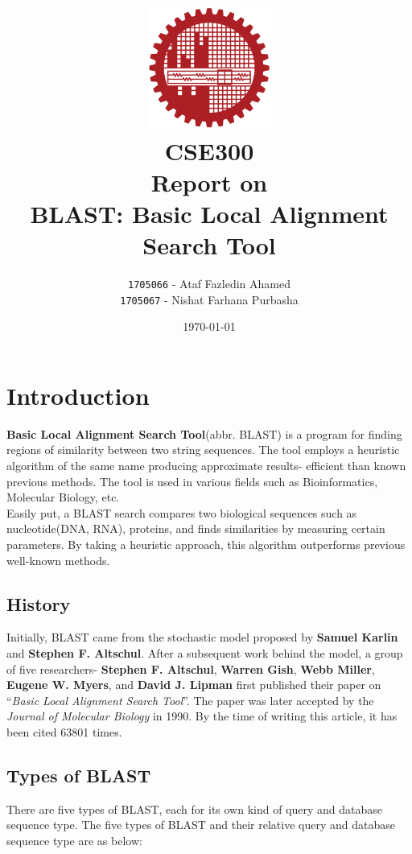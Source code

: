 \documentclass[12pt, a4paper]{report}
\title{
    \includegraphics[width=40mm]{buet_logo.png} \\
    \vspace{40pt}
    CSE300 \\
    \vspace{25pt}
    Report on \\
    BLAST: Basic Local Alignment Search Tool
}
\author{\texttt{1705066} - Ataf Fazledin Ahamed \\ \texttt{1705067} - Nishat Farhana Purbasha}
\date{\today}
\begin{document}
\maketitle


\tableofcontents
\chapter{Introduction}
\textbf{Basic Local Alignment Search Tool}(abbr. BLAST) is a program for finding regions of similarity between two string sequences. The tool employs a heuristic algorithm of the same name producing approximate results- efficient than known previous methods. The tool is used in various fields such as Bioinformatics, Molecular Biology, etc. \\

Easily put, a BLAST search compares two biological sequences such as nucleotide(DNA, RNA), proteins, and finds similarities by measuring certain parameters. By taking a heuristic approach, this algorithm outperforms previous well-known methods.

\section{History}

Initially, BLAST came from the stochastic model proposed by \textbf{Samuel Karlin} and \textbf{Stephen F. Altschul}. After a subsequent work behind the model, a group of five researchers- \textbf{Stephen F. Altschul}, \textbf{Warren Gish}, \textbf{Webb Miller}, \textbf{Eugene W. Myers}, and \textbf{David J. Lipman} first published their paper on “\textit{Basic Local Alignment Search Tool}”. The paper was later accepted by the \textit{Journal of Molecular Biology} in 1990. By the time of writing this article, it has been cited 63801 times.

\section{Types of BLAST}
There are five types of BLAST, each for its own kind of query and database sequence type. The five types of BLAST and their relative query and database sequence type are as below:
\end{document}
